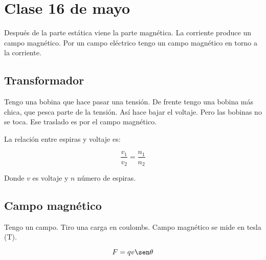 \section{Clase 16 de mayo}

Después de la parte estática viene la parte magnética.
La corriente produce un campo magnético.
Por un campo eléctrico tengo un campo magnético en torno a la corriente.

\subsection{Transformador}

Tengo una bobina que hace pasar una tensión.
De frente tengo una bobina más chica,
que pesca parte de la tensión.
Así hace bajar el voltaje.
Pero las bobinas no se toca.
Ese traslado es por el campo magnético.

La relación entre espiras y voltaje es:

\begin{equation*}
    \frac{v_1}{v_2} = \frac{n_1}{n_2}
\end{equation*}

Donde \(v\) es voltaje y \(n\) número de espiras.

\subsection{Campo magnético}

Tengo un campo.
Tiro una carga en coulombs.
Campo magnético se mide en tesla (T).

\begin{equation*}
    F = qv\sen\theta
\end{equation*}

